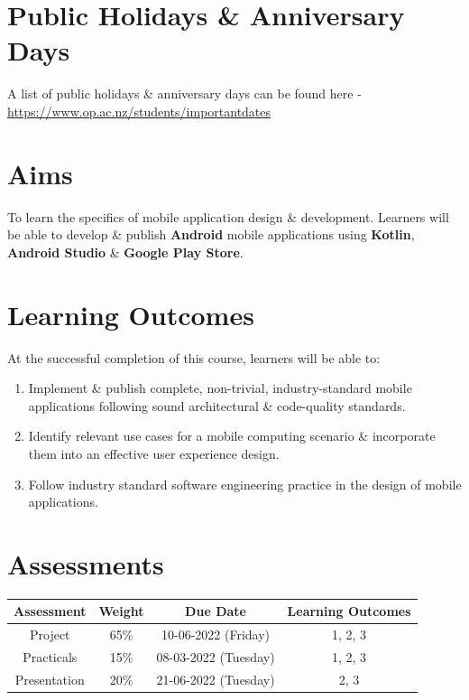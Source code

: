 \documentclass{article}
\begin{document}
\section*{Public Holidays \& Anniversary Days}
A list of public holidays \& anniversary days can be found here - \href{https://www.op.ac.nz/students/importantdates}{https://www.op.ac.nz/students/importantdates}

\section*{Aims}
To learn the specifics of mobile application design \& development. Learners will be able to develop \& publish \textbf{Android} mobile applications using \textbf{Kotlin}, \textbf{Android Studio} \& \textbf{Google Play Store}.

\section*{Learning Outcomes}
At the successful completion of this course, learners will be able to:
\begin{enumerate}
	\item Implement \& publish complete, non-trivial, industry-standard mobile applications following sound architectural \& code-quality standards.
	\item Identify relevant use cases for a mobile computing scenario \& incorporate them into an effective user experience design.
	\item Follow industry standard software engineering practice in the design of mobile applications.
\end{enumerate}

\section*{Assessments}
\renewcommand{\arraystretch}{1.5}
\begin{tabular}{|c|c|c|c|}
	\hline
	\textbf{Assessment} & \textbf{Weight} & \textbf{Due Date}    & \textbf{Learning Outcomes} \\ \hline
	Project             & 65\%            & 10-06-2022 (Friday)  & 1, 2, 3                    \\ \hline
	Practicals          & 15\%            & 08-03-2022 (Tuesday) & 1, 2, 3                    \\ \hline
	Presentation        & 20\%            & 21-06-2022 (Tuesday) & 2, 3                       \\ \hline
\end{tabular}
\end{document}
